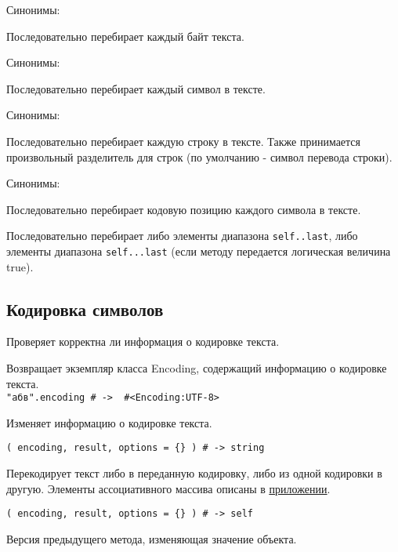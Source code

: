 \begin{methodlist}
  Синонимы: 

  Последовательно перебирает каждый байт текста.

  Синонимы: 

  Последовательно перебирает каждый символ в тексте.

  Синонимы: 

  Последовательно перебирает каждую строку в тексте. Также принимается произвольный разделитель для строк (по умолчанию - символ перевода строки).

  Синонимы: 

  Последовательно перебирает кодовую позицию каждого символа в тексте.

  Последовательно перебирает либо элементы диапазона \verb!self..last!, либо элементы диапазона \verb!self...last! (если методу передается логическая величина true).
\end{methodlist}

\subsection*{Кодировка символов}

\begin{methodlist}
  Проверяет корректна ли информация о кодировке текста.

  Возвращает экземпляр класса Encoding, содержащий информацию о кодировке текста.
  \\\verb!"абв".encoding # ->  #<Encoding:UTF-8>!

  Изменяет информацию о кодировке текста.

  \verb!( encoding, result, options = {} ) # -> string!

  Перекодирует текст либо в переданную кодировку, либо из одной кодировки в другую. Элементы ассоциативного массива описаны в \hyperlink{appenocde}{\underline{приложении}}.

  \verb!( encoding, result, options = {} ) # -> self!

  Версия предыдущего метода, изменяющая значение объекта.
\end{methodlist}

